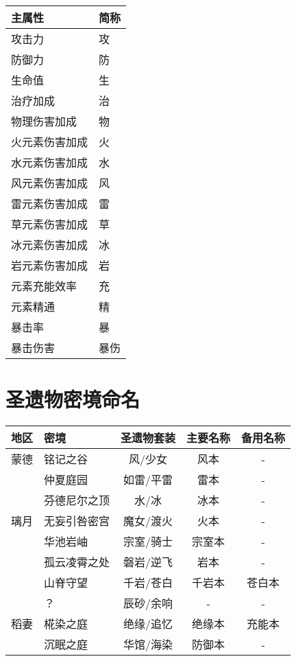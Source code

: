 \begin{longtabu} {|X[c]|X[c]|}
	\hline
	{主属性}         & {简称} \\
	\hline
	\endhead
	\hline
	\endfoot
	{攻击力}         & {攻}   \\
	{防御力}         & {防}   \\
	{生命值}         & {生}   \\
	{治疗加成}         & {治}   \\
	{物理伤害加成}   & {物}   \\
	{火元素伤害加成} & {火}   \\
	{水元素伤害加成} & {水}   \\
	{风元素伤害加成} & {风}   \\
	{雷元素伤害加成} & {雷}   \\
	{草元素伤害加成} & {草}   \\
	{冰元素伤害加成} & {冰}   \\
	{岩元素伤害加成} & {岩}   \\
	\hline
	{元素充能效率}   & {充}   \\
	{元素精通}       & {精}   \\
	\hline
	{暴击率}         & {暴}   \\
	{暴击伤害}       & {暴伤} \\
\end{longtabu}




\section{圣遗物密境命名}

\noindent\begin{tabu}{|c|X[c]|c|c|c|}
	\hline
	{地区} & {密境}         & {圣遗物套装} & {主要名称} & {备用名称} \\
	\hline
	{蒙德} & {铭记之谷}     & {风/少女}    & {风本}     & {-}        \\
	{ }    & {仲夏庭园}     & {如雷/平雷}  & {雷本}     & {-}        \\
	{ }    & {芬德尼尔之顶} & {水/冰}      & {冰本}     & {-}        \\
	\hline
	{璃月} & {无妄引咎密宫} & {魔女/渡火}  & {火本}     & {-}        \\
	{ }    & {华池岩岫}     & {宗室/骑士}  & {宗室本}   & {-}        \\
	{ }    & {孤云凌霄之处} & {磐岩/逆飞}  & {岩本}     & {-}        \\
	{ }    & {山脊守望}     & {千岩/苍白}  & {千岩本}   & {苍白本}   \\
	{ }    & {？}           & {辰砂/余响}  & {-}        & {-}        \\
	\hline
	{稻妻} & {椛染之庭}     & {绝缘/追忆}  & {绝缘本}   & {充能本}   \\
	{ }    & {沉眠之庭}     & {华馆/海染}  & {防御本}   & {-}        \\
	\hline
\end{tabu}




